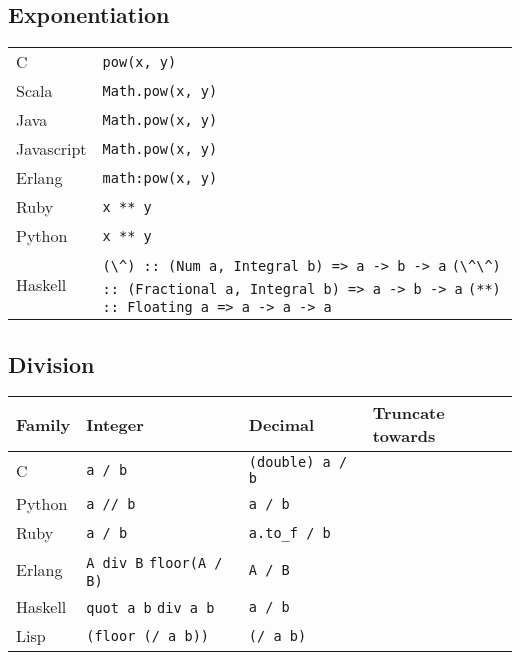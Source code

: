 \documentclass{article}
\begin{document}
\subsection{Exponentiation}
\begin{longtabu} to 0.75\linewidth { X X }
	C & \lstinline$pow(x, y)$ \\
	Scala & \lstinline$Math.pow(x, y)$ \\
	Java & \lstinline$Math.pow(x, y)$ \\
	Javascript & \lstinline$Math.pow(x, y)$ \\
	Erlang & \lstinline$math:pow(x, y)$ \\
	Ruby & \lstinline$x ** y$ \\
	Python & \lstinline$x ** y$ \\
	Haskell & \lstinline$(\^) :: (Num a, Integral b) => a -> b -> a$ \newline \lstinline$(\^\^) :: (Fractional a, Integral b) => a -> b -> a$ \newline \lstinline$(**) :: Floating a => a -> a -> a$ \\
\end{longtabu}

\subsection{Division}
\begin{longtabu} to 0.75\linewidth { X X X X }
	Family & Integer & Decimal & Truncate towards \\
	\hline
	C & \lstinline$a / b$ & \lstinline$(double) a / b$ & \\
	Python & \lstinline$a // b$ & \lstinline$a / b$ & \\
	Ruby & \lstinline$a / b$ & \lstinline$a.to_f / b$ & \\
	Erlang & \lstinline$A div B$ \newline \lstinline$floor(A / B)$ & \lstinline$A / B$ & \\
	Haskell & \lstinline$quot a b$ \newline \lstinline$div a b$ & \lstinline$a / b$ & \\
	Lisp & \lstinline$(floor (/ a b))$ & \lstinline$(/ a b)$ & \\
\end{longtabu}
\end{document}
